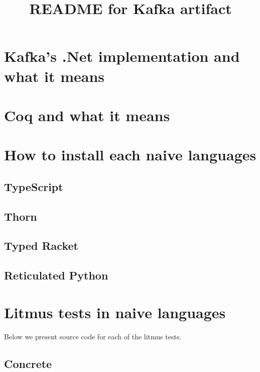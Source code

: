 \documentclass[]{article}
\title{README for Kafka artifact}
\author{}
\date{}
\begin{document}
\maketitle

\section{Kafka's .Net implementation and what it means}

\section{Coq and what it means}


\section{How to install each naive languages}



\subsection{TypeScript}



\subsection{Thorn}



\subsection{Typed Racket}



\subsection{Reticulated Python}



\section{Litmus tests in naive languages}

Below we present source code for each of the litmus tests.

\subsection*{Concrete}
\end{document}
